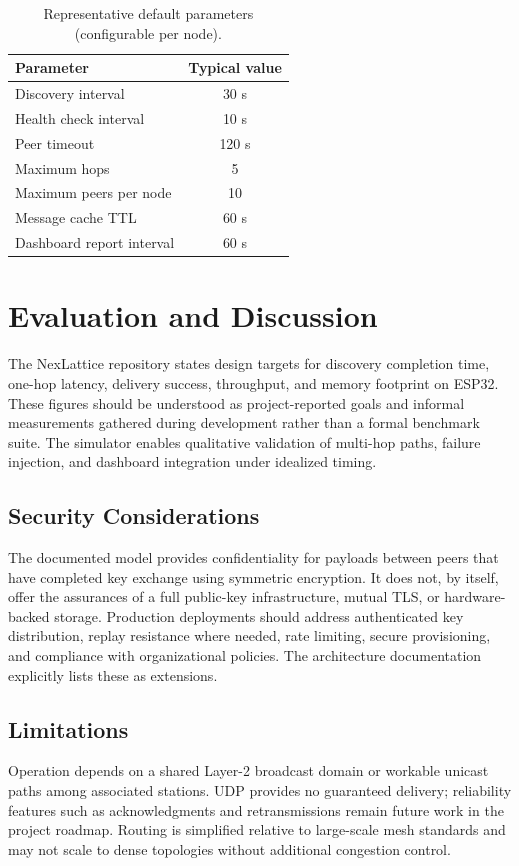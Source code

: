 \documentclass[conference]{IEEEtran}
\begin{document}
\begin{table}[htbp]
\caption{Representative default parameters (configurable per node).}
\label{tab:params}
\begin{center}
\begin{tabular}{l c}
\hline
\textbf{Parameter} & \textbf{Typical value} \\
\hline
Discovery interval & 30 s \\
Health check interval & 10 s \\
Peer timeout & 120 s \\
Maximum hops & 5 \\
Maximum peers per node & 10 \\
Message cache TTL & 60 s \\
Dashboard report interval & 60 s \\
\hline
\end{tabular}
\end{center}
\end{table}

\section{Evaluation and Discussion}
The NexLattice repository states design targets for discovery completion time, one-hop latency, delivery success, throughput, and memory footprint on ESP32. These figures should be understood as project-reported goals and informal measurements gathered during development rather than a formal benchmark suite. The simulator enables qualitative validation of multi-hop paths, failure injection, and dashboard integration under idealized timing.

\subsection{Security Considerations}
The documented model provides confidentiality for payloads between peers that have completed key exchange using symmetric encryption. It does not, by itself, offer the assurances of a full public-key infrastructure, mutual TLS, or hardware-backed storage. Production deployments should address authenticated key distribution, replay resistance where needed, rate limiting, secure provisioning, and compliance with organizational policies. The architecture documentation explicitly lists these as extensions.

\subsection{Limitations}
Operation depends on a shared Layer-2 broadcast domain or workable unicast paths among associated stations. UDP provides no guaranteed delivery; reliability features such as acknowledgments and retransmissions remain future work in the project roadmap. Routing is simplified relative to large-scale mesh standards and may not scale to dense topologies without additional congestion control.
\end{document}
